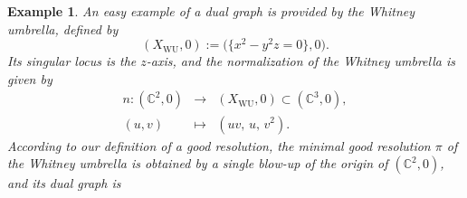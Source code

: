 \documentclass[reqno,dvipsnames,12pt]{amsart}
\newtheorem{defi}[thm]{Definition}
\newtheorem{exam}[thm]{Example}
\begin{document}

\begin{exam}\label{seminormalizationdewhitney}
   An easy example of a dual graph is provided by the Whitney umbrella, defined by
\[
(X_{\mathrm{WU}},0) := \bigl(\{x^2 - y^2 z = 0\}, 0\bigr).
\]
Its singular locus is the \(z\)-axis, and the normalization of the Whitney umbrella is given by
\[
\begin{array}{ccc}
n \colon (\mathbb{C}^2,0) & \longrightarrow & (X_{\mathrm{WU}},0) \subset (\mathbb{C}^3,0), \\
(u,v) & \longmapsto & (uv,\,u,\,v^2).
\end{array}
\]
According to our definition of a good resolution, the minimal good resolution \(\pi\) of the Whitney umbrella is obtained by a single blow-up of the origin of $(\mathbb{C}^2,0)$, and its dual graph is


\begin{figure}[H]
\centering
{}
\end{figure}
\end{exam}
\end{document}
